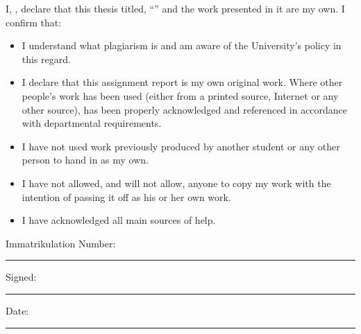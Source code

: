 \newpage

\begin{declaration}
\addchaptertocentry{\authorshipname}

\noindent I, \authorname, declare that this thesis titled, \enquote{\ttitle} and the work presented in it are my own. I confirm that:

\begin{itemize}
\item I understand what plagiarism is and am aware of the University's
  policy in this regard.
\item I declare that this assignment report is my own original work.
  Where other people's work has been used (either from a printed source,
  Internet or any other source), has been properly acknowledged and
  referenced in accordance with departmental requirements.
\item I have not used work previously produced by another student or any
  other person to hand in as my own.
\item I have not allowed, and will not allow, anyone to copy my work with
  the intention of passing it off as his or her own work.
\item I have acknowledged all main sources of help.
\end{itemize}

\vspace*{0.5cm}
\noindent Immatrikulation Number:\\
\rule[0.5em]{25em}{0.5pt}

\noindent Signed:\\
\rule[0.5em]{25em}{0.5pt}

\noindent Date:\\
\rule[0.5em]{25em}{0.5pt}
\end{declaration}
\newpage



